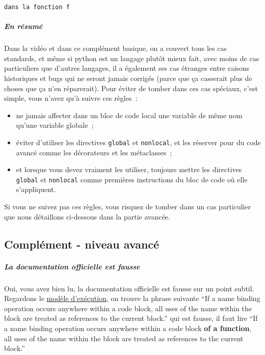    \begin{Verbatim}[commandchars=\\\{\}]
dans la fonction f

    \end{Verbatim}

    \hypertarget{en-ruxe9sumuxe9}{%
\subparagraph{En résumé}\label{en-ruxe9sumuxe9}}

    Dans la vidéo et dans ce complément basique, on a couvert tous les cas
standards, et même si python est un langage plutôt mieux fait, avec
moins de cas particuliers que d'autres langages, il a également ses cas
étranges entre raisons historiques et bugs qui ne seront jamais corrigés
(parce que ça casserait plus de choses que ça n'en réparerait). Pour
éviter de tomber dans ces cas spéciaux, c'est simple, vous n'avez qu'à
suivre ces règles~:

\begin{itemize}
\tightlist
\item
  ne jamais affecter dans un bloc de code local une variable de même nom
  qu'une variable globale~;
\item
  éviter d'utiliser les directives \texttt{global} et \texttt{nonlocal},
  et les réserver pour du code avancé comme les décorateurs et les
  métaclasses~;
\item
  et lorsque vous devez vraiment les utiliser, toujours mettre les
  directives \texttt{global} et \texttt{nonlocal} comme premières
  instructions du bloc de code où elle s'appliquent.
\end{itemize}

Si vous ne suivez pas ces règles, vous risquez de tomber dans un cas
particulier que nous détaillons ci-dessous dans la partie avancée.

    \hypertarget{compluxe9ment---niveau-avancuxe9}{%
\subsection{Complément - niveau
avancé}\label{compluxe9ment---niveau-avancuxe9}}

    \hypertarget{la-documentation-officielle-est-fausse}{%
\subparagraph{La documentation officielle est
fausse}\label{la-documentation-officielle-est-fausse}}

    Oui, vous avez bien lu, la documentation officielle est fausse sur un
point subtil. Regardons le
\href{https://docs.python.org/3/reference/executionmodel.html}{modèle
d'exécution}, on trouve la phrase suivante ``If a name binding operation
occurs anywhere within a code block, all uses of the name within the
block are treated as references to the current block.'' qui est fausse,
il faut lire ``If a name binding operation occurs anywhere within a code
block \textbf{of a function}, all uses of the name within the block are
treated as references to the current block.''

